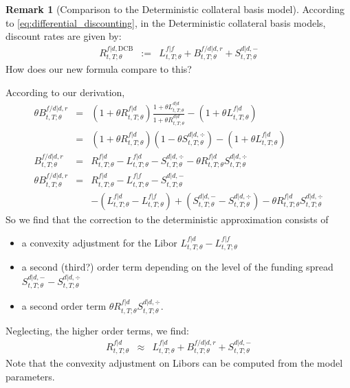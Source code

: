 \documentclass[11pt,english]{amsart}
\newcommand{\DCB}{\mathrm{DCB}}
\theoremstyle{definition}
\newtheorem{rema}{Remark}
\begin{document}
\begin{rema}[Comparison to the Deterministic collateral basis model]
According to \autoref{eq:differential_discounting}, in the Deterministic collateral basis models, discount rates are given by:
\begin{eqnarray*}
	R^{f|d,\DCB}_{t,T;\theta} 
	&:=&  L^{f|f}_{t,T;\theta} + B^{f/d|d,r}_{t,T;\theta}   + S^{d|d,-}_{t,T;\theta}
\end{eqnarray*} 
How does our new formula compare to this?

According to our derivation, 
\begin{eqnarray*}
	 \theta B^{f/d|d,r}_{t,T;\theta} 
	 &=& (1+\theta R^{f|d}_{t,T;\theta})\frac{1+\theta L^{d|d}_{t,T;\theta}}{1+\theta R^{d|d}_{t,T;\theta}} - \left(1+\theta L^{f|d}_{t,T;\theta} \right)  \\
	 &=& (1+\theta R^{f|d}_{t,T;\theta})(1-\theta S^{d|d,\div}_{t,T;\theta}) - \left(1+\theta L^{f|d}_{t,T;\theta} \right)  \\
	 B^{f/d|d,r}_{t,T;\theta}  &=& R^{f|d}_{t,T;\theta} -  L^{f|d}_{t,T;\theta}  - S^{d|d,\div}_{t,T;\theta} - \theta R^{f|d}_{t,T;\theta} S^{d|d,\div}_{t,T;\theta}   \\
  \theta B^{f/d|d,r}_{t,T;\theta} 
  &=& R^{f|d}_{t,T;\theta} -  L^{f|f}_{t,T;\theta} - S^{d|d,-}_{t,T;\theta}  \\
  &  & - \left(L^{f|d}_{t,T;\theta} - L^{f|f}_{t,T;\theta}\right) + \left(S^{d|d,-}_{t,T;\theta} - S^{d|d,\div}_{t,T;\theta}\right) -  \theta R^{f|d}_{t,T;\theta}S^{d|d,\div}_{t,T;\theta}
\end{eqnarray*} 
So we find that the correction to the deterministic approximation consists of 
\begin{itemize}
\item a convexity adjustment for the Libor $L^{f|d}_{t,T;\theta} - L^{f|f}_{t,T;\theta}$
\item a second (third?) order term depending on the level of the funding spread $S^{d|d,-}_{t,T;\theta} - S^{d|d,\div}_{t,T;\theta}$
\item a second order term $\theta R^{f|d}_{t,T;\theta}S^{d|d,\div}_{t,T;\theta}$.
\end{itemize}
Neglecting, the higher order terms, we find:
\begin{eqnarray}
  R^{f|d}_{t,T;\theta} &\approx& 
  L^{f|d}_{t,T;\theta} + B^{f/d|d,r}_{t,T;\theta}   + S^{d|d,-}_{t,T;\theta} 
  \label{eq:comparison_to_dd}
\end{eqnarray} 
Note that the convexity adjustment on Libors can be computed from the model parameters.
\end{rema}
\end{document}
